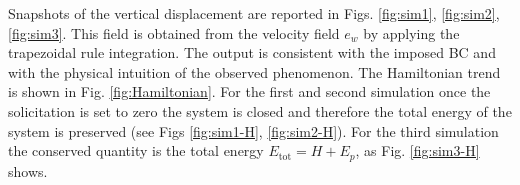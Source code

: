 \documentclass{ifacconf}
\begin{document}
Snapshots of the vertical displacement are reported in Figs. \ref{fig:sim1}, \ref{fig:sim2},  \ref{fig:sim3}. This field is obtained from the velocity field $e_w$ by applying the trapezoidal rule integration. The output is consistent with the imposed BC and with the physical intuition of the observed phenomenon. The Hamiltonian trend is shown in Fig. \ref{fig:Hamiltonian}. For the first and second simulation once the solicitation is set to zero the system is closed and therefore the total energy of the system is preserved (see Figs \ref{fig:sim1-H}, \ref{fig:sim2-H}). For the third simulation the conserved quantity is the total energy $E_{\text{tot}} = H + E_p$, as Fig. \ref{fig:sim3-H}  shows. 

\begin{figure}[ht]%
	\centering
	\hspace{8pt}%
	 \\

\end{figure}
\end{document}
